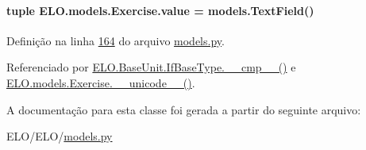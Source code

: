 \paragraph[{value}]{\setlength{\rightskip}{0pt plus 5cm}tuple E\+L\+O.\+models.\+Exercise.\+value = models.\+Text\+Field()\hspace{0.3cm}{\ttfamily [static]}}\label{classELO_1_1models_1_1Exercise_ae4d0d7ecfe0004385c031cbba76f3b4d}


Definição na linha \hyperlink{ELO_2models_8py_source_l00164}{164} do arquivo \hyperlink{ELO_2models_8py_source}{models.\+py}.



Referenciado por \hyperlink{classELO_1_1BaseUnit_1_1IfBaseType_a22d6f30c4d9504a9c20d0ff5a538544d}{E\+L\+O.\+Base\+Unit.\+If\+Base\+Type.\+\_\+\+\_\+cmp\+\_\+\+\_\+()} e \hyperlink{classELO_1_1models_1_1Exercise_a23f81c66e4d6bc5a4582d74d191f5117}{E\+L\+O.\+models.\+Exercise.\+\_\+\+\_\+unicode\+\_\+\+\_\+()}.



A documentação para esta classe foi gerada a partir do seguinte arquivo\+:\begin{DoxyCompactItemize}
\item 
E\+L\+O/\+E\+L\+O/\hyperlink{ELO_2models_8py}{models.\+py}\end{DoxyCompactItemize}
